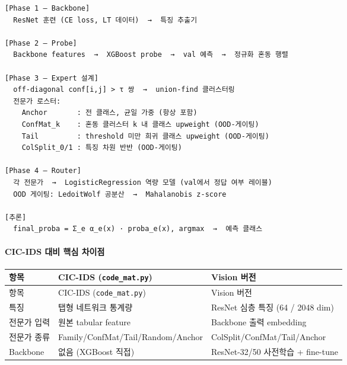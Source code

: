 \begin{Verbatim}[breaklines=true,breakanywhere=true,fontsize=\scriptsize]
[Phase 1 — Backbone]
  ResNet 훈련 (CE loss, LT 데이터)  →  특징 추출기

[Phase 2 — Probe]
  Backbone features  →  XGBoost probe  →  val 예측  →  정규화 혼동 행렬

[Phase 3 — Expert 설계]
  off-diagonal conf[i,j] > τ 쌍  →  union-find 클러스터링
  전문가 로스터:
    Anchor       : 전 클래스, 균일 가중 (항상 포함)
    ConfMat_k    : 혼동 클러스터 k 내 클래스 upweight (OOD-게이팅)
    Tail         : threshold 미만 희귀 클래스 upweight (OOD-게이팅)
    ColSplit_0/1 : 특징 차원 반반 (OOD-게이팅)

[Phase 4 — Router]
  각 전문가  →  LogisticRegression 역량 모델 (val에서 정답 여부 레이블)
  OOD 게이팅: LedoitWolf 공분산  →  Mahalanobis z-score

[추론]
  final_proba = Σ_e α_e(x) · proba_e(x), argmax  →  예측 클래스

\end{Verbatim}
\paragraph{CIC-IDS 대비 핵심 차이점}
\begingroup
\footnotesize
\begin{longtable}{>{\raggedright\arraybackslash}p{}>{\raggedright\arraybackslash}p{}>{\raggedright\arraybackslash}p{}}
\toprule
항목 & CIC-IDS (\texttt{code\_\allowbreak{}\allowbreak{}mat\allowbreak{}.\allowbreak{}py}) & Vision 버전 \\ \midrule
\endfirsthead
항목 & CIC-IDS (\texttt{code\_\allowbreak{}\allowbreak{}mat\allowbreak{}.\allowbreak{}py}) & Vision 버전 \\ \midrule
\endhead
{}특징 & 탭형 네트워크 통계량 & ResNet 심층 특징 (64 /\allowbreak{} 2048 dim) \\
{}전문가 입력 & 원본 tabular feature & Backbone 출력 embedding \\
{}전문가 종류 & Family/\allowbreak{}ConfMat/\allowbreak{}Tail/\allowbreak{}Random/\allowbreak{}Anchor & ColSplit/\allowbreak{}ConfMat/\allowbreak{}Tail/\allowbreak{}Anchor \\
{}Backbone & 없음 (XGBoost 직접) & ResNet-32/\allowbreak{}50 사전학습 +\allowbreak{} fine-tune \\
\bottomrule
\end{longtable}
\endgroup

